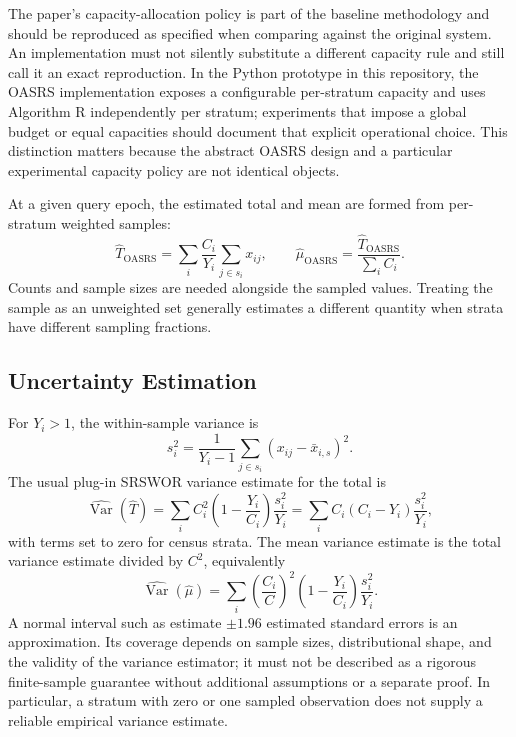 \documentclass[11pt]{article}
\begin{document}
The paper's capacity-allocation policy is part of the baseline methodology and should be reproduced as specified when comparing against the original system. An implementation must not silently substitute a different capacity rule and still call it an exact reproduction. In the Python prototype in this repository, the OASRS implementation exposes a configurable per-stratum capacity and uses Algorithm R independently per stratum; experiments that impose a global budget or equal capacities should document that explicit operational choice. This distinction matters because the abstract OASRS design and a particular experimental capacity policy are not identical objects.

At a given query epoch, the estimated total and mean are formed from per-stratum weighted samples:
\begin{equation}
 \widehat{T}_{\mathrm{OASRS}}=\sum_i\frac{C_i}{Y_i}\sum_{j\in s_i}x_{ij},\qquad
 \widehat{\mu}_{\mathrm{OASRS}}=\frac{\widehat{T}_{\mathrm{OASRS}}}{\sum_i C_i}.
 \label{eq:expansion}
\end{equation}
Counts and sample sizes are needed alongside the sampled values. Treating the sample as an unweighted set generally estimates a different quantity when strata have different sampling fractions.

\subsection{Uncertainty Estimation}

For $Y_i>1$, the within-sample variance is
\begin{equation}
 s_i^2=\frac{1}{Y_i-1}\sum_{j\in s_i}(x_{ij}-\bar{x}_{i,s})^2.
\end{equation}
The usual plug-in SRSWOR variance estimate for the total is
\begin{equation}
 \widehat{\operatorname{Var}}(\widehat{T})
 =\sum_i C_i^2\left(1-\frac{Y_i}{C_i}\right)\frac{s_i^2}{Y_i}
 =\sum_i C_i(C_i-Y_i)\frac{s_i^2}{Y_i},
 \label{eq:total-var-est}
\end{equation}
with terms set to zero for census strata. The mean variance estimate is the total variance estimate divided by $C^2$, equivalently
\begin{equation}
 \widehat{\operatorname{Var}}(\widehat{\mu})
 =\sum_i\left(\frac{C_i}{C}\right)^2
   \left(1-\frac{Y_i}{C_i}\right)\frac{s_i^2}{Y_i}.
\end{equation}
A normal interval such as estimate $\pm 1.96$ estimated standard errors is an approximation. Its coverage depends on sample sizes, distributional shape, and the validity of the variance estimator; it must not be described as a rigorous finite-sample guarantee without additional assumptions or a separate proof. In particular, a stratum with zero or one sampled observation does not supply a reliable empirical variance estimate.
\end{document}
